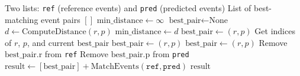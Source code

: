 \begin{ChSevenAlgorithm}[tbp]
\caption{Recursive Best Match}
\label{ch07:alg:recursive_match}
\begin{algorithmic}[1]
\ChSevenAlgRequire Two lists: \texttt{ref} (reference events) and \texttt{pred} (predicted events)
\ChSevenAlgEnsure List of best-matching event pairs
        \ChSevenAlgState \ChSevenAlgReturn $[]$
    \ChSevenAlgEndIf
    \ChSevenAlgState $\text{min\_distance} \gets \infty$
    \ChSevenAlgState $\text{best\_pair} \gets \text{None}$
            \ChSevenAlgState $d \gets \text{ComputeDistance}(r, p)$
                \ChSevenAlgState $\text{min\_distance} \gets d$
                \ChSevenAlgState $\text{best\_pair} \gets (r, p)$
                \ChSevenAlgState Get indices of $r$, $p$, and current $\text{best\_pair}$
                    \ChSevenAlgState $\text{best\_pair} \gets (r, p)$
                    \ChSevenAlgState $\text{best\_pair} \gets (r, p)$
                \ChSevenAlgEndIf
            \ChSevenAlgEndIf
        \ChSevenAlgEndFor
    \ChSevenAlgEndFor
    \ChSevenAlgState Remove $\text{best\_pair.r}$ from \texttt{ref}
    \ChSevenAlgState Remove $\text{best\_pair.p}$ from \texttt{pred}
    \ChSevenAlgState $\text{result} \gets [\text{best\_pair}] + \text{MatchEvents}(\texttt{ref}, \texttt{pred})$
    \ChSevenAlgState \ChSevenAlgReturn $\text{result}$
\ChSevenAlgEndFunction
\end{algorithmic}
\end{ChSevenAlgorithm}